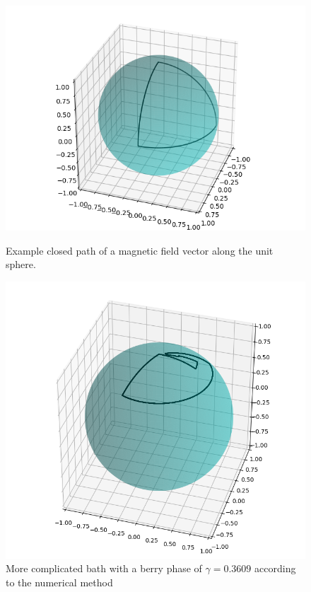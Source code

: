 \documentclass{article}
\begin{document}
\begin{figure}
  \begin{minipage}{.48\textwidth}
    \centering
    \label{fig:berry_path}
    \includegraphics[width=\textwidth]{berry_phase_path_90_90_-90_256.png}
    \caption{Example closed path of a magnetic field vector along the unit sphere.}
  \end{minipage}%
  \hspace{2ex}
  \begin{minipage}{.40\textwidth}
    \centering
    \includegraphics[width=\textwidth]{berry_phase_random_path.png}
    \caption{More complicated bath with a berry phase of $\gamma = 0.3609$ according to the numerical method}
    \label{fig:berry_path_random}
  \end{minipage}
\end{figure}
\end{document}
